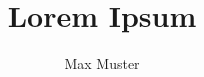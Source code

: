 \documentclass{article}
\title{Lorem Ipsum}
\author{Max Muster}
\begin{document}
\maketitle
\numberpstarttrue  %
\begin{pages}
  \begin{Rightside}


\beginnumbering %
\autopar

\lipsum[1]
\lipsum[2]

\pstart
\lipsum[3]
\pend
        \endnumbering
  \end{Rightside}
  \begin{Leftside}

\beginnumbering %
\autopar

\lipsum[1]
\lipsum[2]

\pstart
\lipsum[3]
\pend
        \endnumbering
  \end{Leftside}
\end{pages}
\Pages
\end{document}
